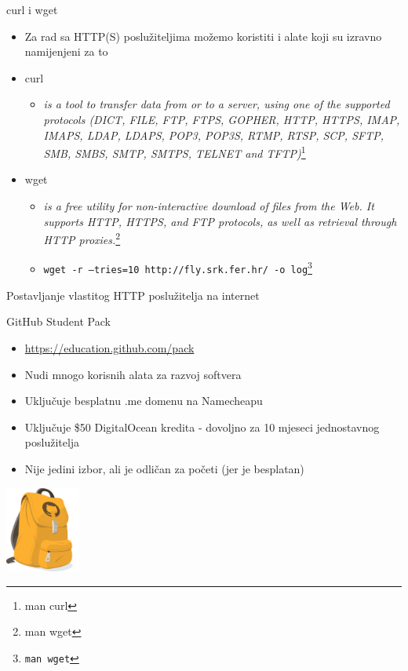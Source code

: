 \documentclass[t]{beamer}
\begin{document}
\begin{frame}{curl i wget}
    \begin{itemize}
        \item Za rad sa HTTP(S) poslužiteljima možemo koristiti i alate koji su izravno namijenjeni za to
        \item curl
        \begin{itemize}
            \item \textit{is  a tool to transfer data from or to a server, using one of the
               supported protocols (DICT, FILE, FTP, FTPS, GOPHER, HTTP, HTTPS,  IMAP,
               IMAPS,  LDAP,  LDAPS,  POP3,  POP3S,  RTMP, RTSP, SCP, SFTP, SMB, SMBS,
               SMTP, SMTPS, TELNET and TFTP)}\footnote{man curl}
        \end{itemize}
        \item wget
        \begin{itemize}
            \item \textit{\textit{is a free utility for non-interactive download of files from
       the Web.  It supports HTTP, HTTPS, and FTP protocols, as well as
       retrieval through HTTP proxies.}}\footnote{man wget}
            \item \texttt{wget -r --tries=10 http://fly.srk.fer.hr/ -o log\footnote{man wget}}
        \end{itemize}
    \end{itemize}
\end{frame}

\begin{frame}
	\vspace*{\fill}
		\begin{center}
			\Huge{Postavljanje vlastitog HTTP poslužitelja na internet}
		\end{center}
	\vspace*{\fill}
\end{frame}

\begin{frame}{GitHub Student Pack}
    \begin{itemize}
        \item \url{https://education.github.com/pack}
        \item Nudi mnogo korisnih alata za razvoj softvera
        \item Uključuje besplatnu .me domenu na Namecheapu
        \item Uključuje \$50 DigitalOcean kredita - dovoljno za 10 mjeseci jednostavnog poslužitelja
        \item Nije jedini izbor, ali je odličan za početi (jer je besplatan)
    \end{itemize}
    \includegraphics[width=\textwidth,height=80pt,keepaspectratio,right]{studentpack.png}
\end{frame}
\end{document}
